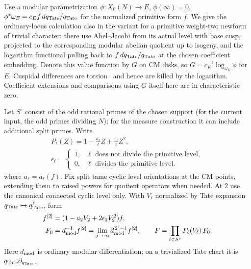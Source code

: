 Use a modular parametrization \(\phi:X_0(N)\to E\), \(\phi(\infty)=0\), \(\phi^*\omega_E=c_E f\,dq_{\rm Tate}/q_{\rm Tate}\) for the normalized primitive form \(f\). We give the ordinary-locus calculation also in the variant for a primitive weight-two newform of trivial character: there use Abel--Jacobi from its actual level with base cusp, projected to the corresponding modular abelian quotient up to isogeny, and the logarithm functional pulling back to \(f\,dq_{\rm Tate}/q_{\rm Tate}\) at the chosen coefficient embedding. Denote this value function by \(G\) on CM disks, so \(G=c_E^{-1}\log_{\omega_E}\phi\) for \(E\). Cuspidal differences are torsion~\cite{ManinDrinfeld} and hence are killed by the logarithm. Coefficient extensions and comparisons using \(G\) itself here are in characteristic zero.

Let \(S^\circ\) consist of the odd rational primes of the chosen support (for the current input, the odd primes dividing \(N\)); for the measure construction it can include additional split primes. Write
\[
 \begin{gathered}
 P_\ell(Z)=1-\frac{a_\ell}{\ell}Z+\frac{\epsilon_\ell}{\ell}Z^2,\\
 \epsilon_\ell=
 \begin{cases}
 1,&\ell\text{ does not divide the primitive level},\\
 0,&\ell\text{ divides the primitive level}.
 \end{cases}
 \end{gathered}
\]
where \(a_\ell=a_\ell(f)\). Fix split tame cyclic level orientations at the CM points, extending them to raised powers for quotient operators when needed. At 2 use the canonical connected cyclic level only. With \(V_\ell\) normalized by Tate expansion \(q_{\rm Tate}\mapsto q_{\rm Tate}^\ell\), form
\[
 \begin{split}
 f^{[2]}&=(1-a_2 V_2+2\epsilon_2 V_2^2)f,\\
 F_0&=d_{\rm mod}^{-1}f^{[2]}=\lim_{j\to\infty} d_{\rm mod}^{\,2^j-1} f^{[2]},\qquad
 F=\prod_{\ell\in S^\circ} P_\ell(V_\ell)\,F_0 .
 \end{split}
\]
Here \(d_{\rm mod}\) is ordinary modular differentiation; on a trivialized
Tate chart it is \(q_{\rm Tate}\partial_{q_{\rm Tate}}\).

